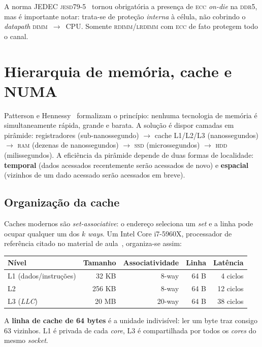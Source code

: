 A norma JEDEC \textsc{jesd79-5}~\cite{jedec2025ddr5} tornou
obrigatória a presença de \textsc{ecc} \textit{on-die} na
\textsc{ddr5}, mas é importante notar: trata-se de proteção
\emph{interna} à célula, não cobrindo o \textit{datapath}
\textsc{dimm}~$\to$~CPU. Somente \textsc{rdimm}/\textsc{lrdimm} com
\textsc{ecc} de fato protegem todo o canal.

\section{Hierarquia de memória, cache e NUMA}
\label{sec:ref-hierarquia}

Patterson e Hennessy~\cite{patterson2017} formalizam o princípio:
nenhuma tecnologia de memória é simultaneamente rápida, grande e
barata. A solução é dispor camadas em pirâmide:
registradores (sub-nanossegundo) $\to$ cache L1/L2/L3
(nanossegundos) $\to$ \textsc{ram} (dezenas de nanossegundos) $\to$
\textsc{ssd} (microssegundos) $\to$ \textsc{hdd} (milissegundos).
A eficiência da pirâmide depende de duas formas de localidade:
\textbf{temporal} (dados acessados recentemente serão acessados
de novo) e \textbf{espacial} (vizinhos de um dado acessado serão
acessados em breve).

\subsection{Organização da cache}

Caches modernos são \textit{set-associative}: o endereço seleciona um
\textit{set} e a linha pode ocupar qualquer um dos $k$ \textit{ways}.
Um Intel Core i7-5960X, processador de referência citado no
material de aula~\cite{koide2026}, organiza-se assim:

\begin{center}
\begin{tabular}{lrrrr}
\toprule
Nível & Tamanho & Associatividade & Linha & Latência \\
\midrule
L1 (dados/instruções) & 32 KB     & 8-way  & 64 B & 4 ciclos \\
L2                    & 256 KB    & 8-way  & 64 B & 12 ciclos \\
L3 (\emph{LLC})       & 20 MB     & 20-way & 64 B & 38 ciclos \\
\bottomrule
\end{tabular}
\end{center}

A \textbf{linha de cache de 64 bytes} é a unidade indivisível: ler
um byte traz consigo 63 vizinhos. L1 é privada de cada \emph{core},
L3 é compartilhada por todos os \emph{cores} do mesmo \emph{socket}.

